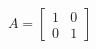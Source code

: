 \documentclass[preview]{standalone}
\begin{document}
\begin{align*}
A = \begin{bmatrix} 1 & 0 \\ 0 & 1 \end{bmatrix}
\end{align*}
\end{document}
